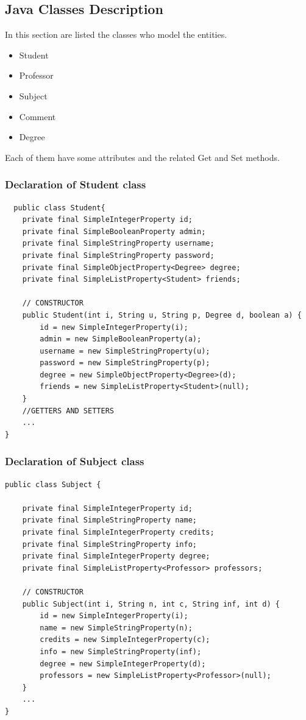 \documentclass[a4paper]{article}
\begin{document}
\subsection{Java Classes Description}

In this section are listed the classes who model the entities.
\begin{itemize}
\item Student
\item Professor
\item Subject
\item Comment
\item Degree
\end{itemize}
Each of them have some attributes and the related Get and Set methods.

\subsubsection{Declaration of Student class}
\begin{verbatim}
  public class Student{
	private final SimpleIntegerProperty id;
    private final SimpleBooleanProperty admin;
    private final SimpleStringProperty username;
    private final SimpleStringProperty password;
    private final SimpleObjectProperty<Degree> degree;
    private final SimpleListProperty<Student> friends;
    
    // CONSTRUCTOR
    public Student(int i, String u, String p, Degree d, boolean a) {
        id = new SimpleIntegerProperty(i);
        admin = new SimpleBooleanProperty(a);
        username = new SimpleStringProperty(u);
        password = new SimpleStringProperty(p);
        degree = new SimpleObjectProperty<Degree>(d);
        friends = new SimpleListProperty<Student>(null);
    }
    //GETTERS AND SETTERS
    ...
}
\end{verbatim}

\subsubsection{Declaration of Subject class}
\begin{verbatim}
public class Subject {

    private final SimpleIntegerProperty id;
    private final SimpleStringProperty name;
    private final SimpleIntegerProperty credits;
    private final SimpleStringProperty info;
    private final SimpleIntegerProperty degree;
    private final SimpleListProperty<Professor> professors;
	
    // CONSTRUCTOR
    public Subject(int i, String n, int c, String inf, int d) {
        id = new SimpleIntegerProperty(i);
        name = new SimpleStringProperty(n);
        credits = new SimpleIntegerProperty(c);
        info = new SimpleStringProperty(inf);
        degree = new SimpleIntegerProperty(d);
        professors = new SimpleListProperty<Professor>(null);
	}
	...
}
\end{verbatim}
\end{document}
